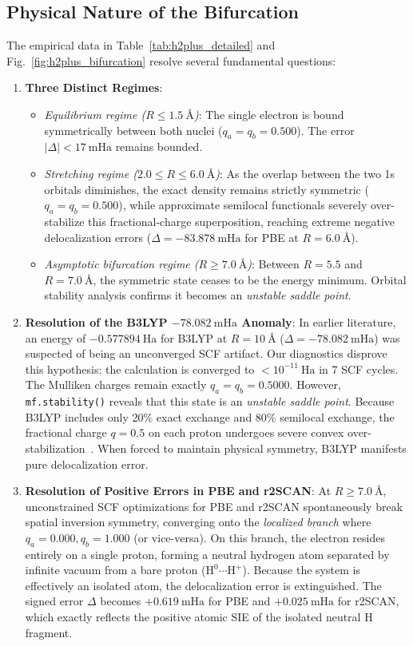 \documentclass[journal]{IEEEtran}
\begin{document}
\subsection{Physical Nature of the Bifurcation}
The empirical data in Table~\ref{tab:h2plus_detailed} and Fig.~\ref{fig:h2plus_bifurcation} resolve several fundamental questions:
\begin{enumerate}
\item \textbf{Three Distinct Regimes}:
  \begin{itemize}
  \item \emph{Equilibrium regime ($R \le 1.5\ \text{\AA}$)}: The single electron is bound symmetrically between both nuclei ($q_a = q_b = 0.500$). The error $|\Delta| < 17\ \text{mHa}$ remains bounded.
  \item \emph{Stretching regime ($2.0 \le R \le 6.0\ \text{\AA}$)}: As the overlap between the two 1s orbitals diminishes, the exact density remains strictly symmetric ($q_a = q_b = 0.500$), while approximate semilocal functionals severely over-stabilize this fractional-charge superposition, reaching extreme negative delocalization errors ($\Delta = -83.878\ \text{mHa}$ for PBE at $R = 6.0\ \text{\AA}$).
  \item \emph{Asymptotic bifurcation regime ($R \ge 7.0\ \text{\AA}$)}: Between $R = 5.5$ and $R = 7.0\ \text{\AA}$, the symmetric state ceases to be the energy minimum. Orbital stability analysis confirms it becomes an \emph{unstable saddle point}.
  \end{itemize}

\item \textbf{Resolution of the B3LYP $-78.082\ \text{mHa}$ Anomaly}:
  In earlier literature, an energy of $-0.577894\ \text{Ha}$ for B3LYP at $R = 10\ \text{\AA}$ ($\Delta = -78.082\ \text{mHa}$) was suspected of being an unconverged SCF artifact. Our diagnostics disprove this hypothesis: the calculation is converged to $<10^{-11}\ \text{Ha}$ in 7 SCF cycles. The Mulliken charges remain exactly $q_a = q_b = 0.5000$. However, \texttt{mf.stability()} reveals that this state is an \emph{unstable saddle point}. Because B3LYP includes only 20\% exact exchange and 80\% semilocal exchange, the fractional charge $q=0.5$ on each proton undergoes severe convex over-stabilization~\cite{CMSY2008}. When forced to maintain physical symmetry, B3LYP manifests pure delocalization error.

\item \textbf{Resolution of Positive Errors in PBE and r2SCAN}:
  At $R \ge 7.0\ \text{\AA}$, unconstrained SCF optimizations for PBE and r2SCAN spontaneously break spatial inversion symmetry, converging onto the \emph{localized branch} where $q_a = 0.000, q_b = 1.000$ (or vice-versa). On this branch, the electron resides entirely on a single proton, forming a neutral hydrogen atom separated by infinite vacuum from a bare proton ($\text{H}^0 \cdots \text{H}^+$). Because the system is effectively an isolated atom, the delocalization error is extinguished. The signed error $\Delta$ becomes $+0.619\ \text{mHa}$ for PBE and $+0.025\ \text{mHa}$ for r2SCAN, which exactly reflects the positive atomic SIE of the isolated neutral H fragment.
\end{enumerate}
\end{document}
